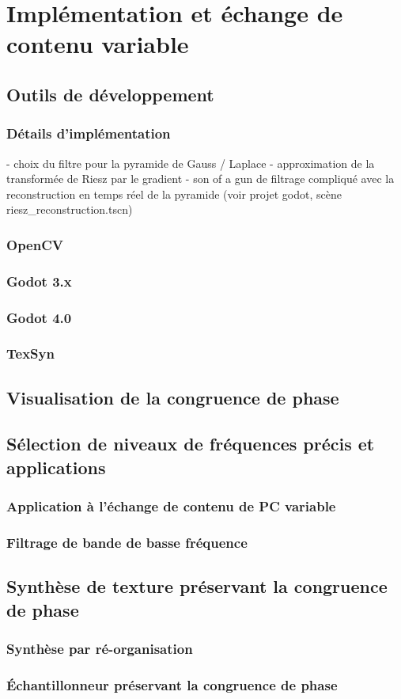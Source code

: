\chapter{Implémentation et échange de contenu variable}
\label{chap:chapitre4}

\section{Outils de développement}

\subsection{Détails d'implémentation}
- choix du filtre pour la pyramide de Gauss / Laplace
- approximation de la transformée de Riesz par le gradient
- son of a gun de filtrage compliqué avec la reconstruction en temps réel de la pyramide (voir projet godot, scène riesz_reconstruction.tscn)

\subsection{OpenCV}
\subsection{Godot 3.x}
\subsection{Godot 4.0}
\subsection{TexSyn}

\section{Visualisation de la congruence de phase}

\section{Sélection de niveaux de fréquences précis et applications}

\subsection{Application à l'échange de contenu de PC variable}

\subsection{Filtrage de bande de basse fréquence}

\section{Synthèse de texture préservant la congruence de phase}

\subsection{Synthèse par ré-organisation}

\subsection{Échantillonneur préservant la congruence de phase}